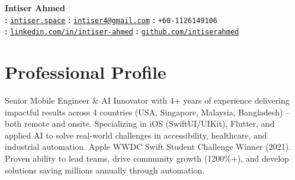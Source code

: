 \documentclass[10pt,letterpaper]{article} %
\makeatletter
\newcommand{\contactItemPlain}[2]{\noindent\textbf{#1: }\texttt{#2}}
\newcommand{\contactLink}[3]{\noindent\textbf{#1: }\href{#2}{\texttt{#3}}}
\newcommand{\yourName}{Intiser Ahmed}
\newcommand{\yourEmail}{intiser4@gmail.com}
\newcommand{\yourPhone}{+60-1126149106}
\newcommand{\githubUserName}{intiserahmed}
\newcommand{\linkedInUserName}{intiser-ahmed}
\makeatother
\begin{document}
\begin{center}
    {\Huge\bfseries \yourName} \\ \vspace{3pt}
    \contactLink{\faGlobe}{https://intiser.space}{intiser.space} \textbullet{}
    \contactLink{\faEnvelope}{mailto:\yourEmail}{\yourEmail} \textbullet{}
    \contactItemPlain{\faMobileAlt}{\yourPhone} \\ \vspace{2pt}
    \contactLink{\faLinkedin}{https://www.linkedin.com/in/\linkedInUserName}{linkedin.com/in/\linkedInUserName} \textbullet{}
    \contactLink{\faGithub}{https://github.com/\githubUserName}{github.com/\githubUserName}
\end{center}
\vspace{1ex}

\section*{Professional Profile}
Senior Mobile Engineer \& AI Innovator with 4+ years of experience delivering impactful results across 4 countries (USA, Singapore, Malaysia, Bangladesh) – both remote and onsite. Specializing in iOS (SwiftUI/UIKit), Flutter, and applied AI to solve real-world challenges in accessibility, healthcare, and industrial automation. Apple WWDC Swift Student Challenge Winner (2021). Proven ability to lead teams, drive community growth (1200\%+), and develop solutions saving millions annually through automation.


\end{document}
